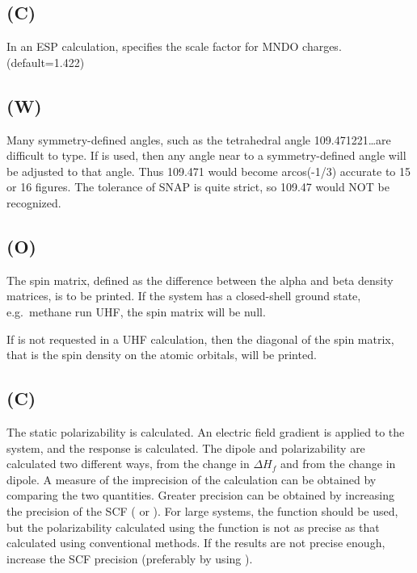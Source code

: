 \subsection*{ (C)}
        In an ESP calculation,  specifies  the  scale  factor  for
   MNDO charges.  (default=1.422)

\subsection*{ (W)}
Many symmetry-defined angles, such as the tetrahedral angle 109.471221\ldots are
difficult to type.  If  is used, then any angle near to a symmetry-defined
angle will be adjusted to that angle.  Thus 109.471 would become arcos(-1/3)
accurate to 15 or 16 figures.  The tolerance of SNAP is quite strict, so 109.47
would NOT be recognized.

\subsection*{ (O)}
The spin matrix, defined as the difference  between  the  alpha  and beta
density  matrices,  is  to  be  printed.   If  the  system  has  a closed-shell
ground state, e.g.\  methane run UHF, the spin matrix will be null.

If  is not requested in a UHF calculation, then the diagonal  of the
spin matrix, that is the spin density on the atomic orbitals, will be printed.

\subsection*{ (C)}
The static polarizability is calculated.  An electric field gradient is
applied to the system, and the response is calculated.  The dipole and
polarizability are calculated two different ways, from the change in $\Delta H_f$
and from the change in dipole.  A measure of the imprecision of the calculation
can be obtained by comparing the two quantities.  Greater precision can be
obtained by increasing the precision of the SCF ( or
).  For large systems, the  function should be used,
but the polarizability calculated using the  function is not
as precise as that calculated using conventional methods.  If the results are
not precise enough, increase the SCF precision (preferably by using
).

